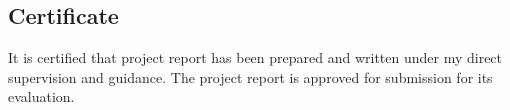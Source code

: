 \begin{center}
  \section*{Certificate}
\end{center}


\begin{spacing}{1.5}
  It is certified that project report has been prepared and written under my direct supervision and guidance. The project report is approved for submission for its evaluation.
\end{spacing}

\begin{flushright}
  {\supervisorname}
\end{flushright}

\clearpage
\vspace*{2cm}